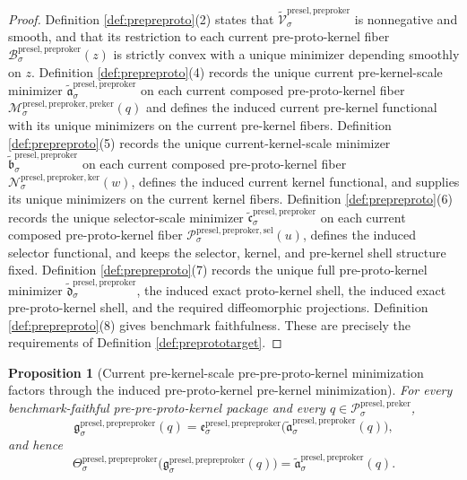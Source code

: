 \documentclass[11pt]{article}
\newcommand{\PreKernelBody}[1]{\mathcal P_{#1}^{\mathrm{presel,preker}}}
\newcommand{\PreProtoKernelFiber}[2]{\mathcal B_{#1}^{\mathrm{presel,preproker}}(#2)}
\newcommand{\PreProtoKernelPreKernelFiber}[2]{\mathcal M_{#1}^{\mathrm{presel,preproker,preker}}(#2)}
\newcommand{\PreProtoKernelKernelFiber}[2]{\mathcal N_{#1}^{\mathrm{presel,preproker,ker}}(#2)}
\newcommand{\PreProtoKernelSelectorFiber}[2]{\mathcal P_{#1}^{\mathrm{presel,preproker,sel}}(#2)}
\newcommand{\PrePreProtoKernelProj}[1]{\Theta_{#1}^{\mathrm{presel,prepreproker}}}
\newcommand{\PrePreProtoKernelMinLift}[1]{\mathfrak e_{#1}^{\mathrm{presel,prepreproker}}}
\newcommand{\PrePreProtoKernelPreKernelMin}[1]{\mathfrak g_{#1}^{\mathrm{presel,prepreproker}}}
\newcommand{\InducedPreProtoKernelFunctional}[1]{\widetilde{\mathscr V}_{#1}^{\mathrm{presel,preproker}}}
\newcommand{\InducedPreProtoKernelPreKernelMin}[1]{\widetilde{\mathfrak a}_{#1}^{\mathrm{presel,preproker}}}
\newcommand{\InducedPreProtoKernelKernelMin}[1]{\widetilde{\mathfrak b}_{#1}^{\mathrm{presel,preproker}}}
\newcommand{\InducedPreProtoKernelSelectorMin}[1]{\widetilde{\mathfrak c}_{#1}^{\mathrm{presel,preproker}}}
\newcommand{\InducedPreProtoKernelFullMin}[1]{\widetilde{\mathfrak d}_{#1}^{\mathrm{presel,preproker}}}
\newtheorem{proposition}{Proposition}
\begin{document}
\begin{proof}
Definition \ref{def:prepreproto}(2) states that \(\InducedPreProtoKernelFunctional{\sigma}\) is nonnegative and smooth, and that its restriction to each current pre-proto-kernel fiber \(\PreProtoKernelFiber{\sigma}{z}\) is strictly convex with a unique minimizer depending smoothly on \(z\). Definition \ref{def:prepreproto}(4) records the unique current pre-kernel-scale minimizer \(\InducedPreProtoKernelPreKernelMin{\sigma}\) on each current composed pre-proto-kernel fiber \(\PreProtoKernelPreKernelFiber{\sigma}{q}\) and defines the induced current pre-kernel functional with its unique minimizers on the current pre-kernel fibers. Definition \ref{def:prepreproto}(5) records the unique current-kernel-scale minimizer \(\InducedPreProtoKernelKernelMin{\sigma}\) on each current composed pre-proto-kernel fiber \(\PreProtoKernelKernelFiber{\sigma}{w}\), defines the induced current kernel functional, and supplies its unique minimizers on the current kernel fibers. Definition \ref{def:prepreproto}(6) records the unique selector-scale minimizer \(\InducedPreProtoKernelSelectorMin{\sigma}\) on each current composed pre-proto-kernel fiber \(\PreProtoKernelSelectorFiber{\sigma}{u}\), defines the induced selector functional, and keeps the selector, kernel, and pre-kernel shell structure fixed. Definition \ref{def:prepreproto}(7) records the unique full pre-proto-kernel minimizer \(\InducedPreProtoKernelFullMin{\sigma}\), the induced exact proto-kernel shell, the induced exact pre-proto-kernel shell, and the required diffeomorphic projections. Definition \ref{def:prepreproto}(8) gives benchmark faithfulness. These are precisely the requirements of Definition \ref{def:preprototarget}.
\end{proof}

\begin{proposition}[Current pre-kernel-scale pre-pre-proto-kernel minimization factors through the induced pre-proto-kernel pre-kernel minimization]
\label{prop:prekerfactor}
For every benchmark-faithful pre-pre-proto-kernel package and every \(q\in\PreKernelBody{\sigma}\),
\[
\PrePreProtoKernelPreKernelMin{\sigma}(q)
=
\PrePreProtoKernelMinLift{\sigma}\bigl(\InducedPreProtoKernelPreKernelMin{\sigma}(q)\bigr),
\]
and hence
\[
\PrePreProtoKernelProj{\sigma}\bigl(\PrePreProtoKernelPreKernelMin{\sigma}(q)\bigr)
=
\InducedPreProtoKernelPreKernelMin{\sigma}(q).
\]
\end{proposition}
\end{document}
